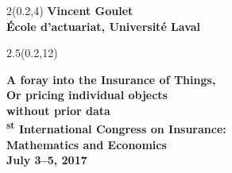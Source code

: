 \begingroup

\textblockorigin{0mm}{0mm}
\begin{frame}[plain]
  \begin{textblock*}{2\TPHorizModule}(0.2\TPHorizModule,4\TPVertModule)
    \fontsize{12}{12}\selectfont
    \bfseries
    Vincent Goulet \\
    \fontsize{10}{11}\selectfont
    \mdseries
    École d'actuariat, Université Laval
  \end{textblock*}

  \begin{textblock*}{2.5\TPHorizModule}(0.2\TPHorizModule,12\TPVertModule)
    \raggedright%
    \bfseries
    \fontsize{20}{20}\selectfont
    A foray into the Insurance of Things, \\
    Or pricing individual objects \\
    without prior data \\
    \mdseries
    \fontsize{12}{13}\textsuperscript{st} International Congress on
    Insurance: \\ Mathematics and Economics \\
    July 3--5, 2017
  \end{textblock*}
\end{frame}
\endgroup


